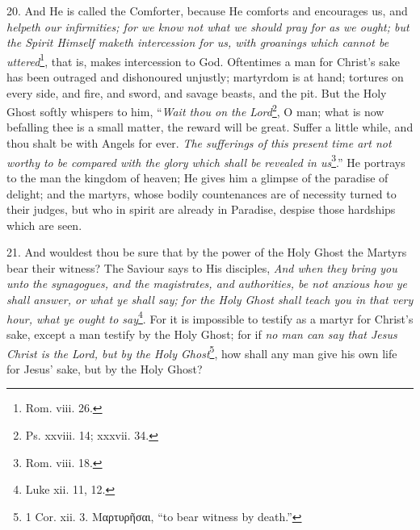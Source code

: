 20. And He is called the Comforter, because He comforts and encourages us, and \emph{helpeth our infirmities; for we know not what we should pray for as we ought; but the Spirit Himself maketh intercession for us, with groanings which cannot be uttered}\footnote{Rom. viii. 26.}, that is, makes intercession to God. Oftentimes a man for Christ’s sake has been outraged and dishonoured unjustly; martyrdom is at hand; tortures on every side, and fire, and sword, and savage beasts, and the pit. But the Holy Ghost softly whispers to him, “\emph{Wait thou on the Lord}\footnote{Ps. xxviii. 14; xxxvii. 34.}, O man; what is now befalling thee is a small matter, the reward will be great. Suffer a little while, and thou shalt be with Angels for ever. \emph{The sufferings of this present time art not worthy to be compared with the glory which shall be revealed in us}\footnote{Rom. viii. 18.}.” He portrays to the man the kingdom of heaven; He gives him a glimpse of the paradise of delight; and the martyrs, whose bodily countenances are of necessity turned to their judges, but who in spirit are already in Paradise, despise those hardships which are seen.

21. And wouldest thou be sure that by the power of the Holy Ghost the Martyrs bear their witness? The Saviour says to His disciples, \emph{And when they bring you unto} \emph{the synagogues, and the magistrates, and authorities, be not anxious how ye shall answer, or what ye shall say; for the Holy Ghost shall teach you in that very hour, what ye ought to say}\footnote{Luke xii. 11, 12.}. For it is impossible to testify as a martyr for Christ’s sake, except a man testify by the Holy Ghost; for if \emph{no man can say that Jesus Christ is the Lord, but by the Holy Ghost}\footnote{1 Cor. xii. 3. \textgreek{Μαρτυρῆσαι}, “to bear witness by death.”}, how shall any man give his own life for Jesus’ sake, but by the Holy Ghost?


